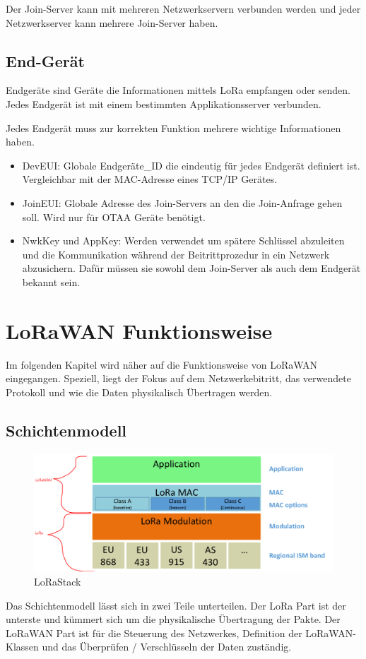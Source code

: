 \documentclass[a4paper, 12pt]{article}
\begin{document}
            Der Join-Server kann mit mehreren Netzwerkservern verbunden werden und jeder Netzwerkserver kann mehrere 
            Join-Server haben.
        \subsection{End-Gerät}\label{sec:endgerät}
            Endgeräte sind Geräte die Informationen mittels LoRa empfangen oder senden. Jedes Endgerät ist mit einem 
            bestimmten Applikationsserver verbunden.

            Jedes Endgerät muss zur korrekten Funktion mehrere wichtige Informationen haben.
            \begin{itemize}
                \item DevEUI: Globale Endgeräte\_ID die eindeutig für jedes Endgerät definiert ist. Vergleichbar 
                mit der MAC-Adresse eines TCP/IP Gerätes.
                \item JoinEUI: Globale Adresse des Join-Servers an den die Join-Anfrage gehen soll. Wird nur für OTAA Geräte
                benötigt.
                \item NwkKey und AppKey: Werden verwendet um spätere Schlüssel abzuleiten und die Kommunikation während
                der Beitrittprozedur in ein Netzwerk abzusichern. Dafür müssen sie sowohl dem Join-Server als auch dem
                Endgerät bekannt sein.
            \end{itemize}
            \cite[S.47 ff.]{LoRaSpec}

    \section{LoRaWAN Funktionsweise}
        Im folgenden Kapitel wird näher auf die Funktionsweise von LoRaWAN eingegangen. Speziell, liegt der Fokus auf
        dem Netzwerkebitritt, das verwendete Protokoll und wie die Daten physikalisch Übertragen werden.
        \subsection{Schichtenmodell}
            \begin{figure}
                \includegraphics[width=\textwidth]{LoraLayer}
                \caption{LoRaStack \cite[S.7]{WhatIsLoRa}}
            \end{figure}
            Das Schichtenmodell lässt sich in zwei Teile unterteilen. Der LoRa Part ist der unterste und kümmert sich 
            um die physikalische Übertragung der Pakte. Der LoRaWAN Part ist für die Steuerung des 
            Netzwerkes, Definition der LoRaWAN-Klassen und das Überprüfen / Verschlüsseln der Daten zuständig.
\end{document}
